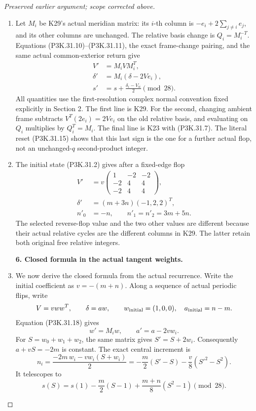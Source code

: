 \begin{proof}[Preserved earlier argument; scope corrected above]
\begin{enumerate}[label=\arabic*.]
\item Let \(M_i\) be K29's actual meridian matrix: its \(i\)-th
column is \(-e_i+2\sum_{j\ne i}e_j\), and its other
columns are unchanged. The relative basis change is
\(Q_i=M_i^{-T}\). Equations (P3K.31.10)--(P3K.31.11), the exact
frame-change pairing, and the same actual common-exterior
return give
\[
 \begin{split}
 V'&=M_iVM_i^T,\\
 \delta'&=M_i(\delta-2Ve_i),\\
 s'&=s+\frac{\delta_i-V_{ii}}2\pmod{28}.
 \end{split}                                             \tag{P3K.31.18}
\]
All quantities use the first-resolution complex normal
convention fixed explicitly in Section 2.
The first line is K29. For the second, changing ambient
frame subtracts \(V^T(2e_i)=2Ve_i\) on the old relative
basis, and evaluating on \(Q_i\) multiplies by
\(Q_i^T=M_i\). The final line is K23 with (P3K.31.7).
The literal reset (P3K.31.15) shows that this last sign is
the one for a further actual flop, not an unchanged-\(q\)
second-product integer.

\item The initial state (P3K.31.2) gives after a fixed-edge flop
\[
 \begin{split}
 V'&=v\begin{pmatrix}1&-2&-2\\-2&4&4\\-2&4&4\end{pmatrix},\\
 \delta'&=(m+3n)(-1,2,2)^T,\\
 n'_0&=-n,\qquad n'_1=n'_2=3m+5n .
 \end{split}                                             \tag{P3K.31.19}
\]
The selected reverse-flop value and the two other
values are different because their actual relative
cycles are the different columns in K29. The latter
retain both original free relative integers.

\par\medskip\noindent\textbf{6. Closed formula in the actual tangent weights.}\enspace

\item We now derive the closed formula from the actual recurrence.
Write the initial coefficient as \(v=-(m+n)\). Along a
sequence of actual periodic flips, write
\[
                  V=vww^T,\qquad \delta=a w,
 \qquad w_{\rm initial}=(1,0,0),\quad a_{\rm initial}=n-m .
\]
Equation (P3K.31.18) gives
\[
       w'=M_iw,\qquad a'=a-2v w_i.
                                                        \tag{P3K.31.20}
\]
For \(S=w_0+w_1+w_2\), the same matrix gives
\(S'=S+2w_i\). Consequently \(a+vS=-2m\) is constant.
The exact central increment is
\[
 n_i=\frac{-2m\,w_i-vw_i(S+w_i)}2
     =-\frac m2(S'-S)-\frac v8(S'^2-S^2).
                                                        \tag{P3K.31.21}
\]
It telescopes to
\[
          s(S)=s(1)-\frac m2(S-1)
                         +\frac{m+n}{8}(S^2-1)\pmod{28}.
                                                        \tag{P3K.31.22}
\]


\end{enumerate}
\end{proof}
